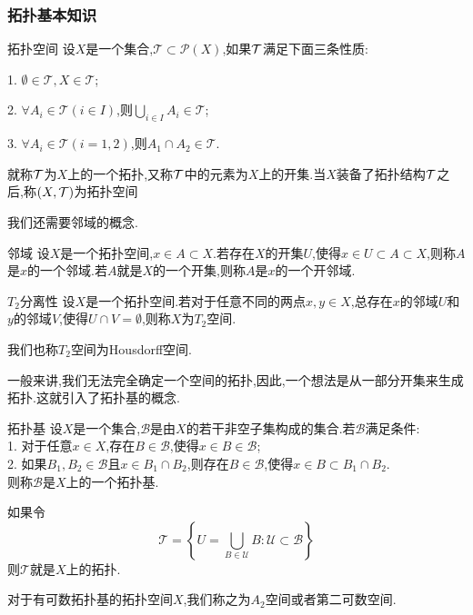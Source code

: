 \subsubsection{拓扑基本知识}
\begin{Definition}{拓扑空间}
    设$X$是一个集合,$\mathcal{T} \subset \mathcal{P} (X)$,如果$\mathcal{T}$满足下面三条性质:\par
    1. $\emptyset \in \mathcal{T},X\in \mathcal{T}$;\par
    2. $\forall A_i \in \mathcal{T} (i\in I)$,则$\bigcup_{i\in I}A_i \in \mathcal{T}$;\par
    3. $\forall A_i \in \mathcal{T} (i=1,2)$,则$A_1\cap A_2 \in \mathcal{T}$.\par
    就称$\mathcal{T}$为$X$上的一个拓扑,又称$\mathcal{T}$中的元素为$X$上的开集.当$X$装备了拓扑结构$\mathcal{T}$之后,称$(X,\mathcal{T})$为拓扑空间
\end{Definition}
我们还需要邻域的概念.
\begin{Definition}{邻域}
    设$X$是一个拓扑空间,$x\in A\subset X$.若存在$X$的开集$U$,使得$x\in U\subset A\subset X$,则称$A$是$x$的一个邻域.若$A$就是$X$的一个开集,则称$A$是$x$的一个开邻域.
\end{Definition}
\begin{Definition}{$T_2$分离性}
    设$X$是一个拓扑空间.若对于任意不同的两点$x,y\in X$,总存在$x$的邻域$U$和$y$的邻域$V$,使得$U\cap V=\emptyset$,则称$X$为$T_2$空间.
\end{Definition}
我们也称$T_2$空间为Housdorff空间.\par
一般来讲,我们无法完全确定一个空间的拓扑,因此,一个想法是从一部分开集来生成拓扑.这就引入了拓扑基的概念.\par
\begin{Definition}{拓扑基}
    设$X$是一个集合,$\mathcal{B}$是由$X$的若干非空子集构成的集合.若$\mathcal{B}$满足条件:\\
    1. 对于任意$x\in X$,存在$B\in \mathcal{B}$,使得$x\in B\in\mathcal{B}$;\\
    2. 如果$B_1,B_2\in\mathcal{B}$且$x\in B_1\cap B_2$,则存在$B\in\mathcal{B}$,使得$x\in B\subset B_1\cap B_2$.\\
    则称$\mathcal{B}$是$X$上的一个拓扑基.
\end{Definition}
如果令
$$
\mathcal{T}=\left\{U=\bigcup_{B\in \mathcal{U}}B:\mathcal{U}\subset\mathcal{B}\right\}
$$
则$\mathcal{T}$就是$X$上的拓扑.\par
对于有可数拓扑基的拓扑空间$X$,我们称之为$A_2$空间或者第二可数空间.
